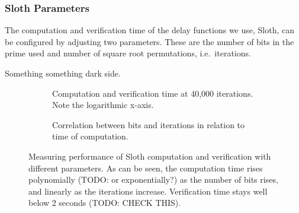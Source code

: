 \subsubsection{Sloth Parameters}%
\label{ssub:sloth_parameters}

The computation and verification time of the delay functions we use, Sloth, can be configured by adjusting two parameters.
These are the number of bits in the prime used and number of square root permutations, i.e.\ iterations.

Something something dark side.

\begin{figure*}
    \centering
        \footnotesize
    \begin{subfigure}[t]{0.4\textwidth}
        \centering
\caption{Computation and verification time at 40,000 iterations. Note the logarithmic x-axis.}
    \end{subfigure}%
    \hfill
    \begin{subfigure}[t]{0.55\textwidth}
        \centering
\caption{Correlation between bits and iterations in relation to time of computation.}
    \end{subfigure}%
    \caption{Measuring performance of Sloth computation and verification with different parameters. As can be seen, the computation time rises polynomially (TODO: or exponentially?) as the number of bits rises, and linearly as the iterations increase. Verification time stays well below 2 seconds (TODO: CHECK THIS).}
\end{figure*}
